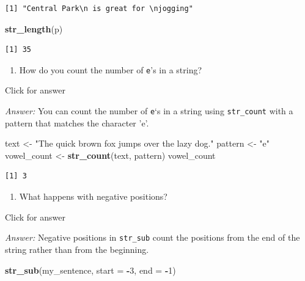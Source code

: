 \documentclass[
]{book}
\newenvironment{Shaded}{\begin{snugshade}}{\end{snugshade}}
\newcommand{\AttributeTok}[1]{\textcolor[rgb]{0.13,0.29,0.53}{#1}}
\newcommand{\DecValTok}[1]{\textcolor[rgb]{0.00,0.00,0.81}{#1}}
\newcommand{\FunctionTok}[1]{\textcolor[rgb]{0.13,0.29,0.53}{\textbf{#1}}}
\newcommand{\NormalTok}[1]{#1}
\newcommand{\OtherTok}[1]{\textcolor[rgb]{0.56,0.35,0.01}{#1}}
\newcommand{\SpecialCharTok}[1]{\textcolor[rgb]{0.81,0.36,0.00}{\textbf{#1}}}
\newcommand{\StringTok}[1]{\textcolor[rgb]{0.31,0.60,0.02}{#1}}
\providecommand{\tightlist}{%
  \setlength{\itemsep}{0pt}\setlength{\parskip}{0pt}}
\begin{document}
\begin{verbatim}
[1] "Central Park\n is great for \njogging"
\end{verbatim}

\begin{Shaded}
\begin{Highlighting}[]
\FunctionTok{str\_length}\NormalTok{(p)}
\end{Highlighting}
\end{Shaded}

\begin{verbatim}
[1] 35
\end{verbatim}

\begin{enumerate}
\def\labelenumi{\alph{enumi}.}
\setcounter{enumi}{5}
\tightlist
\item
  How do you count the number of \texttt{e}'s in a string?
\end{enumerate}

Click for answer

\emph{Answer:} You can count the number of \texttt{e}`s in a string using \texttt{str\_count} with a pattern that matches the character 'e'.

\begin{Shaded}
\begin{Highlighting}[]
\NormalTok{text }\OtherTok{\textless{}{-}} \StringTok{"The quick brown fox jumps over the lazy dog."}
\NormalTok{pattern }\OtherTok{\textless{}{-}} \StringTok{"e"}
\NormalTok{vowel\_count }\OtherTok{\textless{}{-}} \FunctionTok{str\_count}\NormalTok{(text, pattern)}
\NormalTok{vowel\_count}
\end{Highlighting}
\end{Shaded}

\begin{verbatim}
[1] 3
\end{verbatim}

\begin{enumerate}
\def\labelenumi{\alph{enumi}.}
\setcounter{enumi}{6}
\tightlist
\item
  What happens with negative positions?
\end{enumerate}

Click for answer

\emph{Answer:} Negative positions in \texttt{str\_sub} count the positions from the end of the string rather than from the beginning.

\begin{Shaded}
\begin{Highlighting}[]
\FunctionTok{str\_sub}\NormalTok{(my\_sentence, }\AttributeTok{start =} \SpecialCharTok{{-}}\DecValTok{3}\NormalTok{, }\AttributeTok{end =} \SpecialCharTok{{-}}\DecValTok{1}\NormalTok{)}
\end{Highlighting}
\end{Shaded}
\end{document}
